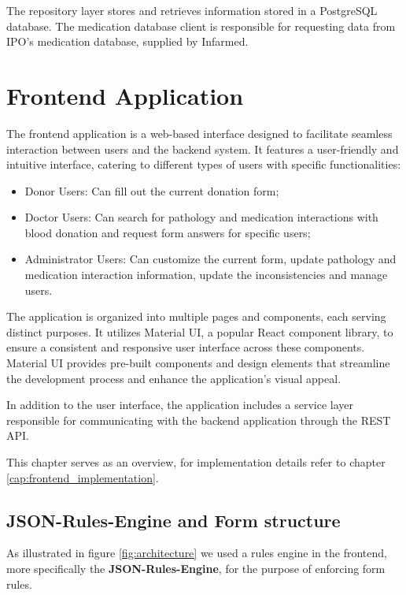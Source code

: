 The repository layer stores and retrieves information stored in a PostgreSQL database.
The medication database client is responsible for requesting data from IPO's medication database, supplied by Infarmed.






\section{Frontend Application}\label{architecture_frontend}

The frontend application is a web-based interface designed to facilitate seamless interaction between users and the backend system. It features a user-friendly and intuitive interface, catering to different types of users with specific functionalities:

\begin{itemize}
	\item Donor Users: Can fill out the current donation form;
	\item Doctor Users: Can search for pathology and medication interactions with blood donation and request form answers for specific users;
	\item Administrator Users: Can customize the current form, update pathology and medication interaction information, update the inconsistencies and manage users.
\end{itemize}

The application is organized into multiple pages and components, each serving distinct purposes. It utilizes Material UI, a popular React component library, to ensure a consistent and responsive user interface across these components. Material UI provides pre-built components and design elements that streamline the development process and enhance the application's visual appeal.

In addition to the user interface, the application includes a service layer responsible for communicating with the backend application through the REST API.

This chapter serves as an overview, for implementation details refer to chapter \ref{cap:frontend_implementation}.

\subsection{JSON-Rules-Engine and Form structure}\label{arc_jre}

As illustrated in figure \ref{fig:architecture} we used a rules engine in the frontend, more specifically the \textbf{JSON-Rules-Engine}, for the purpose of enforcing form rules.

